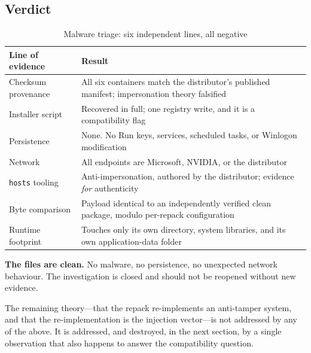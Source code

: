 \subsection{Verdict}

\begin{table}[htbp]
\caption{Malware triage: six independent lines, all negative}
\label{tab:malware}
\centering
\footnotesize
\begin{tabularx}{\columnwidth}{@{}L{2.4cm}X@{}}
\toprule
\textbf{Line of evidence} & \textbf{Result} \\
\midrule
Checksum provenance & All six containers match the distributor's published
                      manifest; impersonation theory falsified \\
Installer script & Recovered in full; one registry write, and it is a
                   compatibility flag \\
Persistence & None. No Run keys, services, scheduled tasks, or Winlogon
              modification \\
Network & All endpoints are Microsoft, NVIDIA, or the distributor \\
\verb|hosts| tooling & Anti-impersonation, authored by the distributor;
                        evidence \emph{for} authenticity \\
Byte comparison & Payload identical to an independently verified clean package,
                  modulo per-repack configuration \\
Runtime footprint & Touches only its own directory, system libraries, and its own
                    application-data folder \\
\bottomrule
\end{tabularx}
\end{table}

\textbf{The files are clean.} No malware, no persistence, no unexpected network
behaviour. The investigation is closed and should not be reopened without new
evidence.

The remaining theory---that the repack re-implements an anti-tamper system, and
that the re-implementation is the injection vector---is not addressed by any of
the above. It is addressed, and destroyed, in the next section, by a single
observation that also happens to answer the compatibility question.
